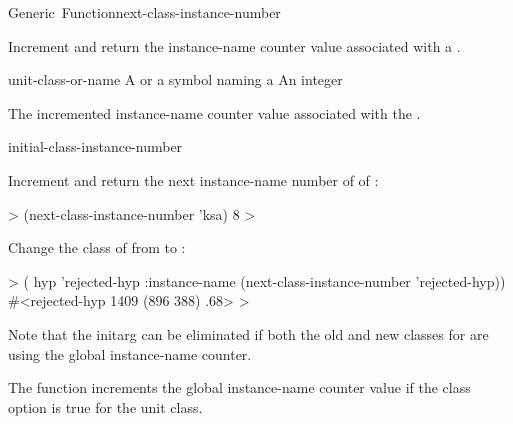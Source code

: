 \documentclass[10pt,twoside,english,pdftex]{article}
\begin{document}
\begin{functiondoc}{Generic~Function}{next-class-instance-number}%
  { 
    \returns{} }
%
%

\fnsyntax

\fnpurpose Increment and return the instance-name counter value
associated with a .

\fnmethods
{}%
  {\code{(} 
  \returns{} } 
%
  {\code{(} 
  \returns{} }

\fnpackage {}

\fnmodule {}

\fnargs
\begin{args}{unit-class-or-name}
 A  or a symbol naming a
\arg[integer] An integer
\end{args}

\fnreturns The incremented instance-name counter value
associated with the .

\begin{alsos}{initial-class-instance-number}
\end{alsos}

\fnexamples
%
Increment and return the next instance-name number of 
of :
%
\W\supp
\begin{example}
  > (next-class-instance-number 'ksa)
  8
  >
\end{example} 

%
%
Change the class of   from
 to :
%
\W\supp
\begin{example}
  > ( hyp 'rejected-hyp 
      :instance-name (next-class-instance-number 'rejected-hyp))
  #<rejected-hyp 1409 (896 388) .68>
  >
\end{example}
%
Note that the  initarg can be eliminated if both
the old and new classes for  are using the global instance-name
counter.

\fnnote
%
%
The  function increments the global
instance-name counter value if the
 class option is true for the
unit class.

\end{functiondoc}
\end{document}
